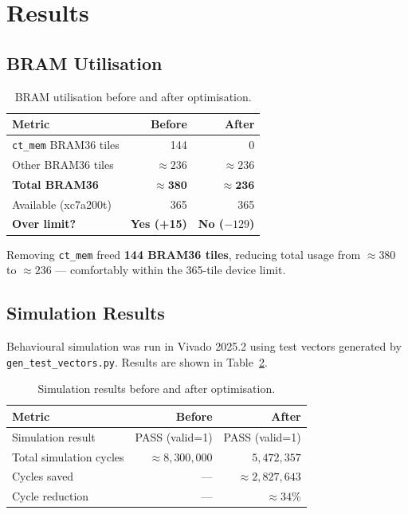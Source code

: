 \documentclass[12pt, a4paper]{article}
\begin{document}
\section{Results}
\label{sec:results}

\subsection{BRAM Utilisation}

\begin{table}[h]
\centering
\begin{tabular}{lrr}
\toprule
\textbf{Metric} & \textbf{Before} & \textbf{After} \\
\midrule
\texttt{ct\_mem} BRAM36 tiles & 144 & 0 \\
Other BRAM36 tiles & $\approx 236$ & $\approx 236$ \\
\textbf{Total BRAM36} & $\mathbf{\approx 380}$ & $\mathbf{\approx 236}$ \\
Available (xc7a200t) & 365 & 365 \\
\textbf{Over limit?} & \textbf{Yes (+15)} & \textbf{No ($-129$)} \\
\bottomrule
\end{tabular}
\caption{BRAM utilisation before and after optimisation.}
\label{tab:bram_after}
\end{table}

Removing \texttt{ct\_mem} freed \textbf{144 BRAM36 tiles}, reducing
total usage from $\approx 380$ to $\approx 236$ --- comfortably within
the 365-tile device limit.

\subsection{Simulation Results}

Behavioural simulation was run in Vivado 2025.2 using test vectors
generated by \texttt{gen\_test\_vectors.py}. Results are shown in
Table~\ref{tab:sim}.

\begin{table}[h]
\centering
\begin{tabular}{lrr}
\toprule
\textbf{Metric} & \textbf{Before} & \textbf{After} \\
\midrule
Simulation result & PASS (valid=1) & PASS (valid=1) \\
Total simulation cycles & $\approx 8{,}300{,}000$ & $5{,}472{,}357$ \\
Cycles saved & --- & $\approx 2{,}827{,}643$ \\
Cycle reduction & --- & $\approx 34\%$ \\
\bottomrule
\end{tabular}
\caption{Simulation results before and after optimisation.}
\label{tab:sim}
\end{table}
\end{document}
